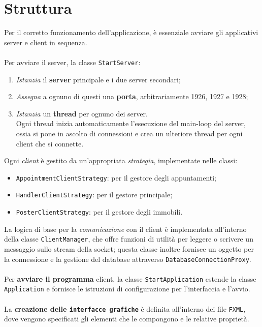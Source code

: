 \chapter{Struttura}
\noindent Per il corretto funzionamento dell'applicazione, è essenziale avviare gli applicativi server e client in sequenza.\\
\\
Per avviare il server, la classe \texttt{StartServer}:
\begin{enumerate}
    \item \textit{Istanzia} il \textbf{server} principale e i due server secondari;
    \item \textit{Assegna} a ognuno di questi una \textbf{porta}, arbitrariamente 1926, 1927 e 1928;
    \item \textit{Istanzia} un \textbf{thread} per ognuno dei server.\\
        Ogni thread inizia automaticamente l’esecuzione del main-loop del server, ossia si pone in ascolto di connessioni e crea un ulteriore thread per ogni client che si connette.
\end{enumerate}
Ogni \textit{client} è gestito da un’appropriata \textit{strategia}, implementate nelle classi:
\begin{itemize}
    \item \texttt{AppointmentClientStrategy}: per il gestore degli appuntamenti;
    \item \texttt{HandlerClientStrategy}: per il gestore principale;
    \item \texttt{PosterClientStrategy}: per il gestore degli immobili.
\end{itemize}
La logica di base per la \textit{comunicazione} con il client è implementata all’interno della classe \texttt{ClientManager}, che offre funzioni di utilità per leggere o scrivere un messaggio sullo stream della socket; questa classe inoltre fornisce un oggetto per la connessione e la gestione del database attraverso \texttt{DatabaseConnectionProxy}.\\
\\
Per \textbf{avviare il programma} client, la classe \texttt{StartApplication} estende la classe \texttt{Application} e fornisce le istruzioni di configurazione per l'interfaccia e l'avvio.\\
\\
La \textbf{creazione delle \texttt{interfacce grafiche}} è definita all'interno dei file \texttt{FXML}, dove vengono specificati gli elementi che le compongono e le relative proprietà.\\ 
